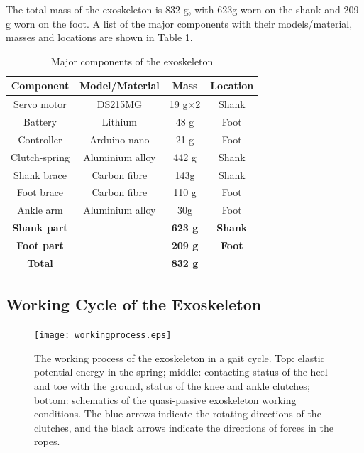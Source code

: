 \documentclass[twocolumn,cleanfoot,10pt]{asme2ej}
\begin{document}
The total mass of the exoskeleton is 832 g, with 623g worn on the shank and 209 g worn on the foot.
A list of the major components with their models/material, masses and locations are shown in
Table 1.


\begin{table}[t]
	\caption{Major components of the exoskeleton}
	\begin{center}
		\label{tab:hardware}
		\begin{tabular}{c c c c}	
			\hline
			\textbf{Component} & \textbf{Model/Material} & \textbf{Mass} & \textbf{Location} \\
			\hline
			Servo motor & DS215MG & 19 g$\times$2 & Shank\\
			Battery & Lithium & 48 g & Foot\\
			Controller & Arduino nano & 21 g & Foot\\
			Clutch-spring & Aluminium alloy & 442 g & Shank\\
			Shank brace & Carbon fibre & 143g & Shank\\
			Foot brace & Carbon fibre & 110 g & Foot\\
			Ankle arm & Aluminium alloy & 30g & Foot\\			
			\hline 
			\textbf{Shank part} & & \textbf{623 g} & \textbf{Shank}\\
			\textbf{Foot part} & & \textbf{209 g} & \textbf{Foot}\\
			\hline
			\textbf{Total} & & \textbf{832 g} & \\
			\hline
		\end{tabular}
	\end{center}
\end{table}


\subsection{Working Cycle of the Exoskeleton}
\label{subsec:Working process}

\begin{figure}[tb]
	\centering
	\texttt{[image: workingprocess.eps]}
	\caption{The working process of the exoskeleton in a gait cycle.
	Top: elastic potential energy in the spring; middle: contacting status of the heel and toe with the ground, status of the knee and ankle clutches; bottom: schematics of the quasi-passive exoskeleton working conditions.
	The blue arrows indicate the rotating directions of the clutches, and the black arrows indicate the directions of forces in the ropes.}
	\label{fig:workprocess}   
\end{figure}
\end{document}
